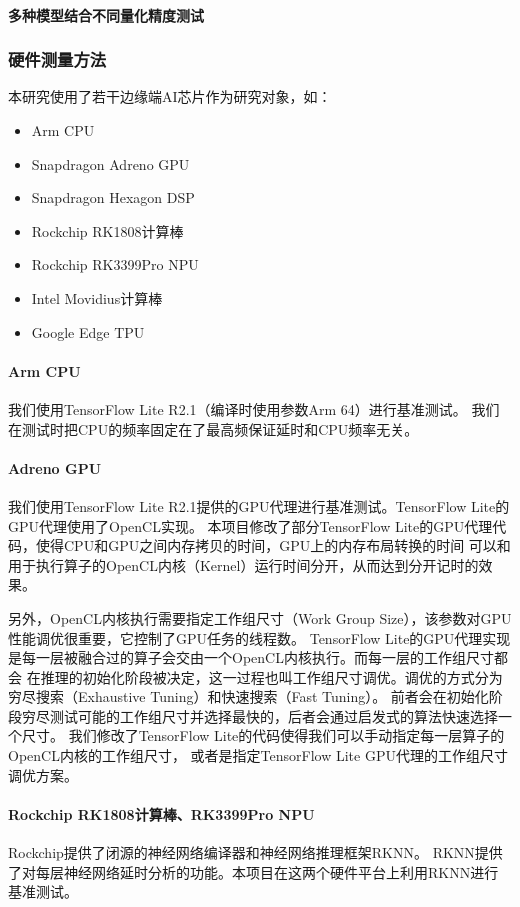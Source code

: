 \paragraph{多种模型结合不同量化精度测试}

\subsubsection{硬件测量方法}
本研究使用了若干边缘端AI芯片作为研究对象，如：
\begin{itemize}
    \item Arm CPU
    \item Snapdragon Adreno GPU
    \item Snapdragon Hexagon DSP
    \item Rockchip RK1808计算棒
    \item Rockchip RK3399Pro NPU
    \item Intel Movidius计算棒
    \item Google Edge TPU
\end{itemize}

\paragraph{Arm CPU}
我们使用TensorFlow Lite R2.1（编译时使用参数Arm 64）进行基准测试。
我们在测试时把CPU的频率固定在了最高频保证延时和CPU频率无关。

\paragraph{Adreno GPU}
我们使用TensorFlow Lite R2.1提供的GPU代理进行基准测试。TensorFlow Lite的GPU代理使用了OpenCL实现。
本项目修改了部分TensorFlow Lite的GPU代理代码，使得CPU和GPU之间内存拷贝的时间，GPU上的内存布局转换的时间
可以和用于执行算子的OpenCL内核（Kernel）运行时间分开，从而达到分开记时的效果。

另外，OpenCL内核执行需要指定工作组尺寸（Work Group Size），该参数对GPU性能调优很重要，它控制了GPU任务的线程数。
TensorFlow Lite的GPU代理实现是每一层被融合过的算子会交由一个OpenCL内核执行。而每一层的工作组尺寸都会
在推理的初始化阶段被决定，这一过程也叫工作组尺寸调优。调优的方式分为穷尽搜索（Exhaustive Tuning）和快速搜索（Fast Tuning）。
前者会在初始化阶段穷尽测试可能的工作组尺寸并选择最快的，后者会通过启发式的算法快速选择一个尺寸。
我们修改了TensorFlow Lite的代码使得我们可以手动指定每一层算子的OpenCL内核的工作组尺寸，
或者是指定TensorFlow Lite GPU代理的工作组尺寸调优方案。

\paragraph{Rockchip RK1808计算棒、RK3399Pro NPU}
Rockchip提供了闭源的神经网络编译器和神经网络推理框架RKNN。
RKNN提供了对每层神经网络延时分析的功能。本项目在这两个硬件平台上利用RKNN进行基准测试。

